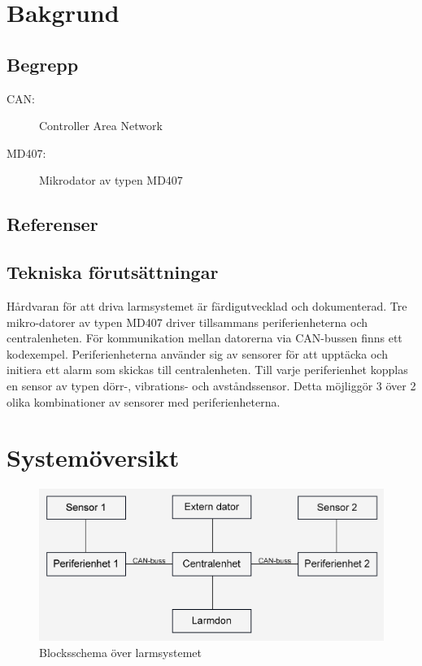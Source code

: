 \documentclass[a4paper]{article}
\begin{document}



\section{Bakgrund}


\subsection{Begrepp}

\begin{description}
    \item[CAN:] Controller Area Network
    \item[MD407:] Mikrodator av typen MD407 
\end{description}

\subsection{Referenser}

\subsection{Tekniska förutsättningar}

Hårdvaran för att driva larmsystemet är färdigutvecklad och dokumenterad. Tre mikro-datorer av typen MD407 driver tillsammans periferienheterna och centralenheten. För kommunikation mellan datorerna via CAN-bussen finns ett kodexempel. Periferienheterna använder sig av sensorer för att upptäcka och initiera ett alarm som skickas till centralenheten. Till varje periferienhet kopplas en sensor av typen dörr-, vibrations- och avståndssensor. Detta möjliggör 3 över 2 olika kombinationer av sensorer med periferienheterna.


\section{Systemöversikt}

\begin{figure}[H]
    \centering
    \includegraphics[width=\textwidth]{blockschema.png}
    \caption{Blocksschema över larmsystemet}
\end{figure}
\end{document}
